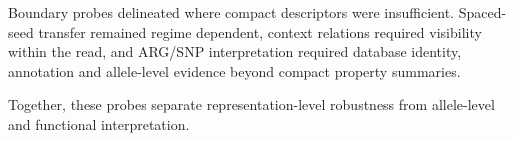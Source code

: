 Boundary probes delineated where compact descriptors were insufficient. Spaced-seed transfer remained regime dependent, context relations required visibility within the read, and ARG/SNP interpretation required database identity, annotation and allele-level evidence beyond compact property summaries.

Together, these probes separate representation-level robustness from allele-level and functional interpretation.

\begin{table}[!tbp]
\centering
\scriptsize
\caption{Boundary and mechanism summary for the spaced-seed, context-visibility and ARG/SNP probes. The table reports the tested mechanism, observed limitation and corresponding operating boundary for compact representations.}
\label{tab:table5}

\end{table}
